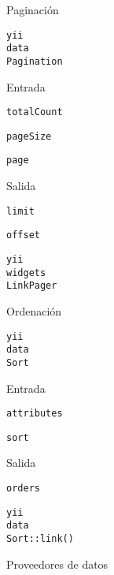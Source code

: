 \begin{longenum}
\begin{longenum}
\begin{longenum}
        \end{longenum}
        \item Paginación
        \begin{longenum}
            \item \texttt{yii\\data\\Pagination}
            \item Entrada
            \begin{longenum}
                \item \texttt{totalCount}
                \item \texttt{pageSize}
                \item \texttt{page}
            \end{longenum}
            \item Salida
            \begin{longenum}
                \item \texttt{limit}
                \item \texttt{offset}
            \end{longenum}
            \item \texttt{yii\\widgets\\LinkPager}
        \end{longenum}
        \item Ordenación
        \begin{longenum}
            \item \texttt{yii\\data\\Sort}
            \item Entrada
            \begin{longenum}
                \item \texttt{attributes}
                \item \texttt{sort}
            \end{longenum}
            \item Salida
            \begin{longenum}
                \item \texttt{orders}
            \end{longenum}
            \item \texttt{yii\\data\\Sort::link()}
        \end{longenum}
        \item Proveedores de datos

\end{longenum}
\end{longenum}
